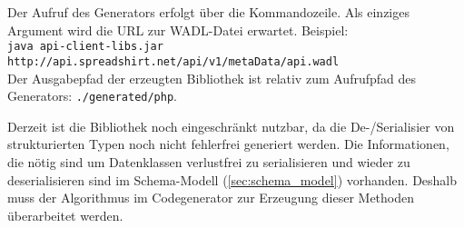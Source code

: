 Der Aufruf des Generators erfolgt über die Kommandozeile. Als einziges Argument wird die \gls{URL} zur \gls{WADL}-Datei erwartet. Beispiel:\\ 
{\footnotesize \texttt{java api-client-libs.jar http://api.spreadshirt.net/api/v1/metaData/api.wadl}}\\
Der Ausgabepfad der erzeugten Bibliothek ist relativ zum Aufrufpfad des Generators: \texttt{./generated/php}.

Derzeit ist die Bibliothek noch eingeschränkt nutzbar, da die De-/Serialisier von strukturierten Typen noch nicht fehlerfrei generiert werden. Die Informationen, die nötig sind um Datenklassen verlustfrei zu serialisieren und wieder zu deserialisieren sind im Schema-Modell (\cref{sec:schema_model}) vorhanden. Deshalb muss der Algorithmus im Codegenerator zur Erzeugung dieser Methoden überarbeitet werden.

